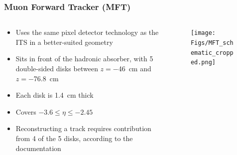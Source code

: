 \documentclass[10pt]{beamer}
\begin{document}
\begin{frame}
    \frametitle{Muon Forward Tracker (MFT)}

    \begin{columns}[c]
        \begin{column}{0.5\textwidth}
            \begin{itemize}
                \item Uses the same pixel detector technology as the ITS in a better-suited geometry
                \item Sits in front of the hadronic absorber, with 5 double-sided disks between $z=$\SI{-46}{\centi\metre} and $z=$\SI{-76.8}{\centi\metre}
                \item Each disk is \SI{1.4}{\centi\metre} thick
                \item Covers $-3.6\leq\eta\leq -2.45$
                \item Reconstructing a track requires contribution from 4 of the 5 disks, according to the documentation
            \end{itemize}
        \end{column}

        \begin{column}{0.5\textwidth}
            \begin{figure}[h]
                \begin{center}
                    \texttt{[image: Figs/MFT\_schematic\_cropped.png]}
                \end{center}
            \end{figure}
        \end{column}
    \end{columns}

\end{frame}
\end{document}

